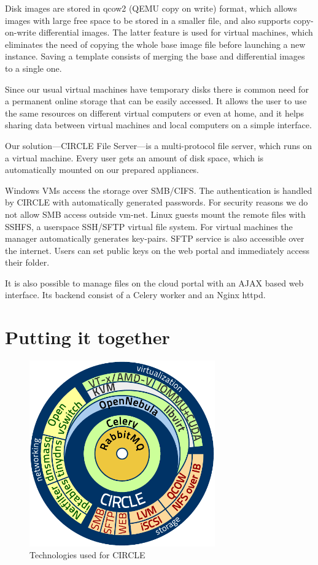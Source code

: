 \documentclass{llncs}
\begin{document}
   Disk images are stored in qcow2 (QEMU copy on write) format, which allows images with large free space to be stored in a smaller file, and also supports copy-on-write differential images. The latter feature is used for virtual machines, which eliminates the need of copying the whole base image file before launching a new instance. Saving a template consists of merging the base and differential images to a single one.

   Since our usual virtual machines have temporary disks there is common need for a permanent online storage that can be easily accessed. It allows the user to use the same resources on different virtual computers or even at home, and it helps sharing data between virtual machines and local computers on a simple interface.

   Our solution---CIRCLE File Server---is a multi-protocol file server, which runs on a virtual machine. Every user gets an amount of disk space, which is automatically mounted on our prepared appliances.

   Windows VMs access the storage over SMB/CIFS. The authentication is handled by CIRCLE with automatically generated passwords. For security reasons we do not allow SMB access outside vm-net.
   Linux guests mount the remote files with SSHFS\cite{hoskins2006sshfs}, a userspace SSH/SFTP virtual file system. For virtual machines the manager automatically generates key-pairs. SFTP service is also accessible over the internet. Users can set public keys on the web portal and immediately access their folder.

   It is also possible to manage files on the cloud portal with an AJAX based web interface. Its backend consist of a Celery worker and an Nginx httpd.
   
   \section{Putting it together}

\begin{figure}[ht]
    \centering
    \includegraphics[width=8cm]{swarch}
    \caption{Technologies used for CIRCLE}
\end{figure}
\end{document}
